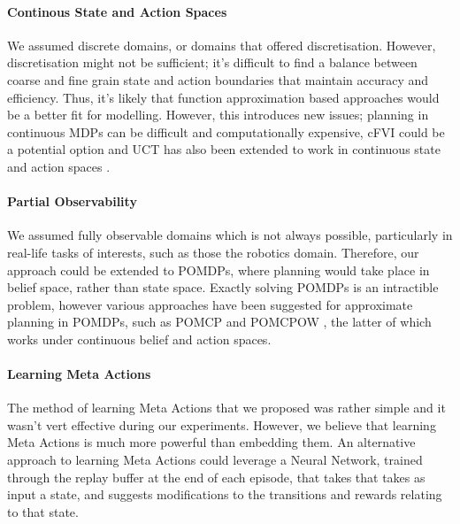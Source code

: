 \paragraph*{Continous State and Action Spaces}\label{p:cont}
We assumed discrete domains, or domains that offered discretisation. However, discretisation might not be sufficient; it's difficult to find a balance between coarse and fine grain state and action boundaries that maintain accuracy and efficiency. Thus, it's likely that function approximation based approaches would be a better fit for modelling. However, this introduces new issues; planning in continuous MDPs can be difficult and computationally expensive, cFVI  \cite{210504682} could be a potential option and UCT has also been extended to work in continuous state and action spaces \cite{10.1007/978-3-642-25566-3_32}.



\paragraph*{Partial Observability}
We assumed fully observable domains which is not always possible, particularly in real-life tasks of interests, such as those the robotics domain. Therefore, our approach could be extended to POMDPs, where planning would take place in belief space, rather than state space. Exactly solving POMDPs is an intractible problem, however various approaches have been suggested for approximate planning in POMDPs, such as POMCP \cite{NIPS2010_edfbe1af} and POMCPOW \cite{DBLP:journals/corr/abs-1709-06196}, the latter of which works under continuous belief and action spaces.

\paragraph*{Learning Meta Actions}
The method of learning Meta Actions that we proposed was rather simple and it wasn't vert effective during our experiments. However, we believe that learning Meta Actions is much more powerful than embedding them. An alternative approach to learning Meta Actions could leverage a Neural Network, trained through the replay buffer at the end of each episode, that takes that takes as input a state, and suggests modifications to the transitions and rewards relating to that state.

